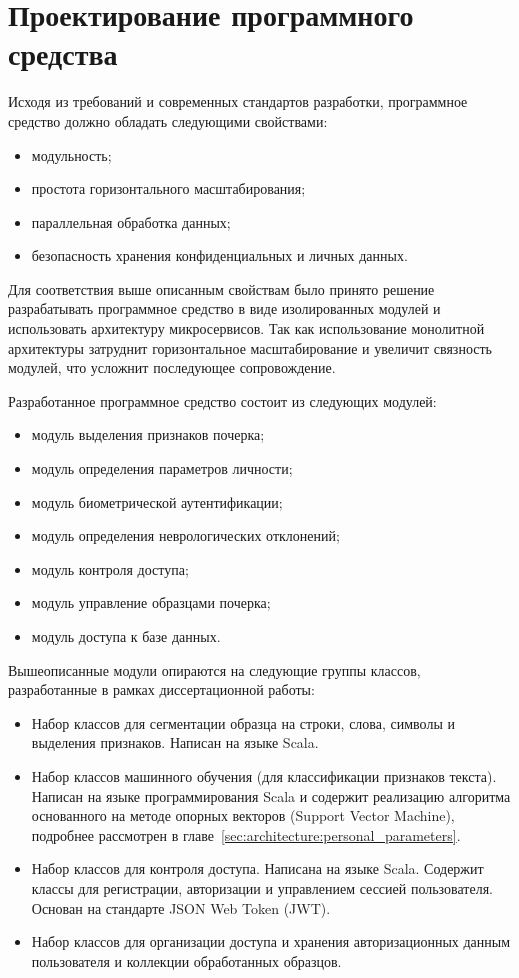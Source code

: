 \section{Проектирование программного средства}

Исходя из требований и современных стандартов разработки, программное средство должно обладать следующими свойствами:
\begin{itemize}
    \item модульность;
    \item простота горизонтального масштабирования;
    \item параллельная обработка данных;
    \item безопасность хранения конфиденциальных и личных данных.
\end{itemize}

Для соответствия выше описанным свойствам было принято решение разрабатывать программное средство в виде изолированных модулей и использовать архитектуру микросервисов. Так как использование монолитной архитектуры затруднит горизонтальное масштабирование и увеличит связность модулей, что усложнит последующее сопровождение. 

Разработанное программное средство состоит из следующих модулей:
\begin{itemize}
    \item модуль выделения признаков почерка;
    \item модуль определения параметров личности;
    \item модуль биометрической аутентификации;
    \item модуль определения неврологических отклонений;
    \item модуль контроля доступа;
    \item модуль управление образцами почерка;
    \item модуль доступа к базе данных.
\end{itemize}

Вышеописанные модули опираются на следующие группы классов, разработанные в рамках диссертационной работы:
\begin{itemize}
    \item Набор классов для сегментации образца на строки, слова, символы и выделения признаков. Написан на языке Scala.
    \item Набор классов машинного обучения (для классификации признаков текста). Написан на языке программирования Scala и содержит реализацию алгоритма основанного на методе опорных векторов (Support Vector Machine), подробнее рассмотрен в главе~\ref{sec:architecture:personal_parameters}.
    \item Набор классов для контроля доступа. Написана на языке Scala. Содержит классы для регистрации, авторизации и управлением сессией пользователя. Основан на стандарте JSON Web Token (JWT).
    \item Набор классов для организации доступа и хранения авторизационных данным пользователя и коллекции обработанных образцов.
\end{itemize}

